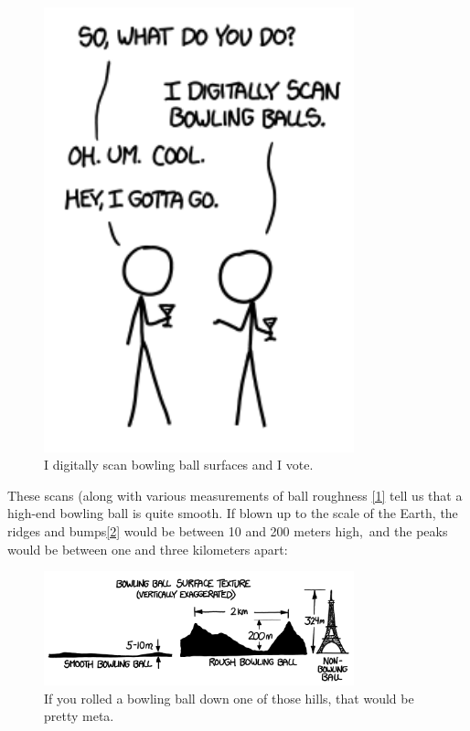 {\begin{figure}[!htbp]
\centering
\includegraphics[scale=0.5, max width=0.8\textwidth]{imgs/a/46/bowling_scan.png}
\caption{I digitally scan bowling ball surfaces and I vote.}
\end{figure}

{These scans (along with various measurements of ball roughness \href{http://classic.bowl.com/news/specsandcerts/index.jsp}{[1]} tell us that a high-end bowling ball is quite smooth. If blown up to the scale of the Earth, the ridges and bumps\href{http://www.itbca.bowlingknowledge.info/index.php/winter-2013/85-bowling-ball-shell-chemistry-101}{[2]} would be between 10 and 200 meters high, and the peaks would be between one and three kilometers apart:}

\begin{figure}[!htbp]
\centering
\includegraphics[scale=0.5, max width=0.8\textwidth]{imgs/a/46/bowling_texture.png}
\caption{If you rolled a bowling ball down one of those hills, that would be pretty meta.}
\end{figure}

}
